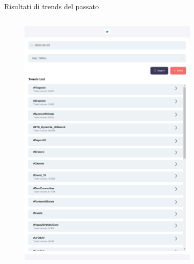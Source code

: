 \documentclass[xcolor=svgnames, aspectratio=169]{beamer}
\begin{document}
\begin{frame}{Risultati di trends del passato}
    \begin{columns}[t]
        \vspace*{-12pt}
        \begin{figure}[H]
            \centering
            \includegraphics[width=0.32\paperwidth,height=0.7\paperheight,keepaspectratio]{Immagini/FrontEnd_TrendrApp_Scelta_Location_Paese_City_Risultati.pdf}
        \end{figure}
        \vspace*{-12pt}
        \begin{figure}[H]
            \centering

\end{figure}
\end{columns}
\end{frame}
\end{document}
